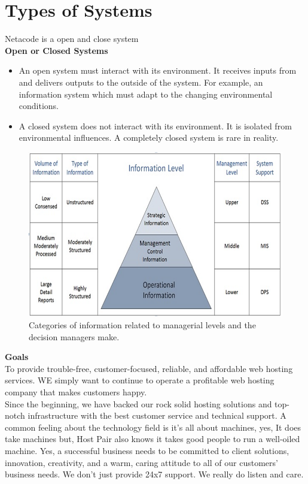\documentclass[a4paper,12pt]{report}
\begin{document}
\section{Types of Systems}
Netacode is a open and close system\\

\textbf{Open or Closed Systems}
\begin{itemize}
	\item	An open system must interact with its environment. It receives inputs from and delivers outputs to the outside of the system. For example, an information system which must adapt to the changing environmental conditions.
	\item	A closed system does not interact with its environment. It is isolated from environmental influences. A completely closed system is rare in reality.
\end{itemize}
\begin{figure}[h]
	\centering
	\includegraphics[width=0.7\linewidth]{3}
	\caption{Categories of information related to managerial levels and the decision managers make.}
	\label{fig:3}
\end{figure}
\textbf{Goals}\\
To provide trouble-free, customer-focused, reliable, and affordable web hosting services. WE simply want
to continue to operate a profitable web hosting company that makes customers happy. \\Since the
beginning, we have backed our rock solid hosting solutions and top-notch infrastructure with the best
customer service and technical support. A common feeling about the technology field is it's all about
machines, yes, It does take machines but, Host Pair also knows it takes good people to run a well-oiled
machine. Yes, a successful business needs to be committed to client solutions, innovation, creativity, and
a warm, caring attitude to all of our customers' business needs. We don't just provide 24x7 support. We
really do listen and care.
\end{document}
